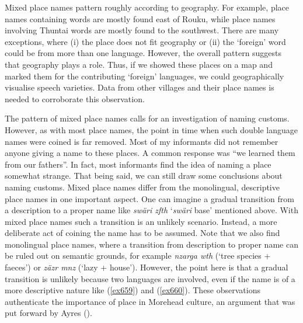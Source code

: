 Mixed place names pattern roughly according to geography. For example, place names containing  words are mostly found east of Rouku, while place names involving  Thuntai words are mostly found to the southwest. There are many exceptions, where (i) the place does not fit geography or (ii) the `foreign' word could be from more than one language. However, the overall pattern suggests that geography plays a role. Thus, if we showed these places on a map and marked them for the contributing `foreign' languages, we could geographically visualise speech varieties. Data from other villages and their place names is needed to corroborate this observation.

The pattern of mixed place names calls for an investigation of naming customs. However, as with most place names, the point in time when such double language names were coined is far removed. Most of my informants did not remember anyone giving a name to these places. A common response was ``we learned them from our fathers''. In fact, most informants find the idea of naming a place somewhat strange. That being said, we can still draw some conclusions about naming customs. Mixed place names differ from the monolingual, descriptive place names in one important aspect. One can imagine a gradual transition from a description to a proper name like \emph{swäri zfth} `\emph{swäri} base' mentioned above. With mixed place names such a transition is an unlikely scenario. Instead, a more deliberate act of coining the name has to be assumed. Note that we also find monolingual place names, where a transition from description to proper name can be ruled out on semantic grounds, for example \emph{nzarga wth} (`tree species + faeces') or \emph{zäzr mnz} (`lazy + house'). However, the point here is that a gradual transition is unlikely because two languages are involved, even if the name is of a more descriptive nature like (\ref{ex659}) and (\ref{ex660}). These observations authenticate the importance of place in Morehead culture, an argument that was put forward by Ayres (\citeyear{Ayres:ws}).

